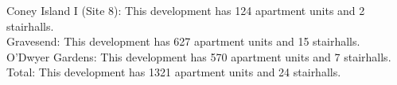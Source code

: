 {Coney Island I (Site 8)}: This development has 124 apartment units and 2 stairhalls.\\{Gravesend}: This development has 627 apartment units and 15 stairhalls.\\{O'Dwyer Gardens}: This development has 570 apartment units and 7 stairhalls.\\{Total}: This development has 1321 apartment units and 24 stairhalls.\\